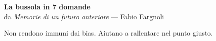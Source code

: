 \documentclass[11pt]{article}
\begin{document}
\begin{center}
{\sffamily\Large\bfseries La bussola in 7 domande}\\[0.3em]
{\sffamily\small\color{moderngray}da \textit{Memorie di un futuro anteriore} --- Fabio Fargnoli}
\end{center}
\vspace{0.6em}
\small

\vfill
\begin{center}\footnotesize\color{moderngray}
Non rendono immuni dai bias. Aiutano a rallentare nel punto giusto.
\end{center}
\end{document}
